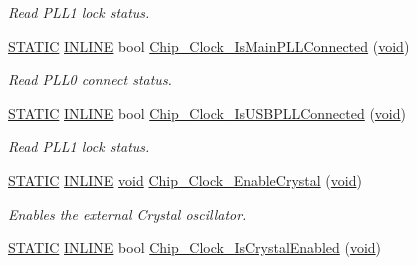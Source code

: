 \begin{DoxyCompactItemize}
\begin{DoxyCompactList}\small\item\em Read P\-L\-L1 lock status. \end{DoxyCompactList}\item 
\hyperlink{group__LPC__Types__Public__Macros_ga10b2d890d871e1489bb02b7e70d9bdfb}{S\-T\-A\-T\-I\-C} \hyperlink{group__LPC__Types__Public__Types_ga2eb6f9e0395b47b8d5e3eeae4fe0c116}{I\-N\-L\-I\-N\-E} bool \hyperlink{group__CLOCK__17XX__40XX_ga4cbf783493d584cf1cf130763599a247}{Chip\-\_\-\-Clock\-\_\-\-Is\-Main\-P\-L\-L\-Connected} (\hyperlink{Paradigm_2Tern__EE_2small_2portmacro_8h_a14d32f8130d3c0b212cfc751730b5b49}{void})
\begin{DoxyCompactList}\small\item\em Read P\-L\-L0 connect status. \end{DoxyCompactList}\item 
\hyperlink{group__LPC__Types__Public__Macros_ga10b2d890d871e1489bb02b7e70d9bdfb}{S\-T\-A\-T\-I\-C} \hyperlink{group__LPC__Types__Public__Types_ga2eb6f9e0395b47b8d5e3eeae4fe0c116}{I\-N\-L\-I\-N\-E} bool \hyperlink{group__CLOCK__17XX__40XX_ga7c8ad0dfc57700cefd53a0beb81955f3}{Chip\-\_\-\-Clock\-\_\-\-Is\-U\-S\-B\-P\-L\-L\-Connected} (\hyperlink{Paradigm_2Tern__EE_2small_2portmacro_8h_a14d32f8130d3c0b212cfc751730b5b49}{void})
\begin{DoxyCompactList}\small\item\em Read P\-L\-L1 lock status. \end{DoxyCompactList}\item 
\hyperlink{group__LPC__Types__Public__Macros_ga10b2d890d871e1489bb02b7e70d9bdfb}{S\-T\-A\-T\-I\-C} \hyperlink{group__LPC__Types__Public__Types_ga2eb6f9e0395b47b8d5e3eeae4fe0c116}{I\-N\-L\-I\-N\-E} \hyperlink{Paradigm_2Tern__EE_2small_2portmacro_8h_a14d32f8130d3c0b212cfc751730b5b49}{void} \hyperlink{group__CLOCK__17XX__40XX_ga970e95c74fe056b7d846004c90a58012}{Chip\-\_\-\-Clock\-\_\-\-Enable\-Crystal} (\hyperlink{Paradigm_2Tern__EE_2small_2portmacro_8h_a14d32f8130d3c0b212cfc751730b5b49}{void})
\begin{DoxyCompactList}\small\item\em Enables the external Crystal oscillator. \end{DoxyCompactList}\item 
\hyperlink{group__LPC__Types__Public__Macros_ga10b2d890d871e1489bb02b7e70d9bdfb}{S\-T\-A\-T\-I\-C} \hyperlink{group__LPC__Types__Public__Types_ga2eb6f9e0395b47b8d5e3eeae4fe0c116}{I\-N\-L\-I\-N\-E} bool \hyperlink{group__CLOCK__17XX__40XX_gaa6cb29b84e27240e44c6ab89775bac97}{Chip\-\_\-\-Clock\-\_\-\-Is\-Crystal\-Enabled} (\hyperlink{Paradigm_2Tern__EE_2small_2portmacro_8h_a14d32f8130d3c0b212cfc751730b5b49}{void})

\end{DoxyCompactItemize}
